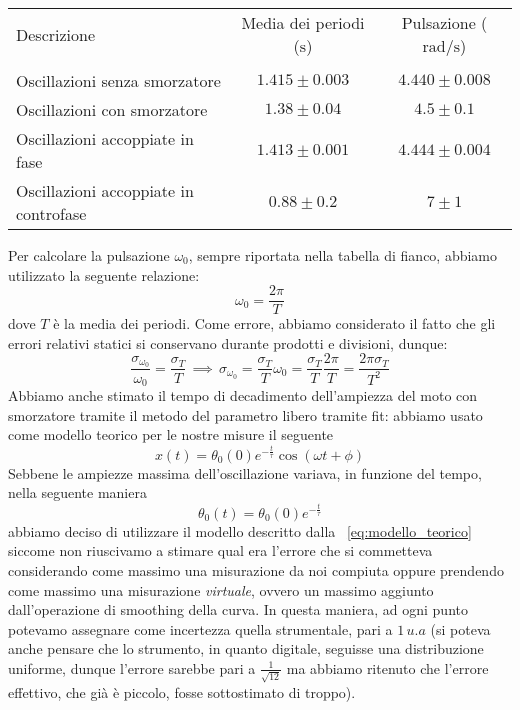 \documentclass{article}
\begin{document}
\begin{table}
\centering
\begin{tabular}{l c c} \toprule
Descrizione & Media dei periodi ($\si{\second}$) & Pulsazione ($\si{\radian\per\second}$) \\ \\ \toprule
Oscillazioni senza smorzatore & $1.415 \pm 0.003$ & $4.440 \pm 0.008$ \\ \midrule
Oscillazioni con smorzatore & $1.38 \pm 0.04$ & $4.5 \pm 0.1$ \\ \midrule
Oscillazioni accoppiate in fase & $1.413 \pm 0.001$ & $4.444 \pm 0.004$ \\ \midrule
Oscillazioni accoppiate in controfase & $0.88 \pm 0.2$ & $7 \pm 1$ \\ \bottomrule
\end{tabular}
\end{table}

\noindent Per calcolare la pulsazione $\omega_0$, sempre riportata nella tabella di fianco, abbiamo utilizzato la seguente relazione:
\begin{equation}
	\omega_0 = \frac{2\pi}{T}
\end{equation}
dove $T$ è la media dei periodi. Come errore, abbiamo considerato il fatto che gli errori relativi statici si conservano durante prodotti e divisioni, dunque:
\begin{equation*}
	\frac{\sigma_{\omega_0}}{\omega_0} = \frac{\sigma_{T}}{T} \, \implies \, \sigma_{\omega_0} = \frac{\sigma_T}{T} \omega_0 = \frac{\sigma_T}{T} \frac{2\pi}{T} = \frac{2\pi \sigma_T}{T^2}
\end{equation*}
Abbiamo anche stimato il tempo di decadimento dell'ampiezza del moto con smorzatore tramite il metodo del parametro libero tramite fit: abbiamo usato come modello teorico per le nostre misure il seguente
\begin{equation}
	x(t) = \theta_0 (0)e^{-\frac{t}{\tau}}\cos{\left( \omega t + \phi \right) }
	\label{eq:modello_teorico}
\end{equation}
Sebbene le ampiezze massima dell'oscillazione variava, in funzione del tempo, nella seguente maniera
$$
	\theta_0 (t) = \theta_0 (0) e^{-\frac{t}{\tau}}
$$
abbiamo deciso di utilizzare il modello descritto dalla ~\ref{eq:modello_teorico} siccome non riuscivamo a stimare qual era l'errore che si commetteva considerando come massimo una misurazione da noi compiuta oppure prendendo come massimo una misurazione \emph{virtuale}, ovvero un massimo aggiunto dall'operazione di smoothing della curva. In questa maniera, ad ogni punto potevamo assegnare come incertezza quella strumentale, pari a $1 \, u.a$ (si poteva anche pensare che lo strumento, in quanto digitale, seguisse una distribuzione uniforme, dunque l'errore sarebbe pari a $\frac{1}{\sqrt{12}}$ ma abbiamo ritenuto che l'errore effettivo, che già è piccolo, fosse sottostimato di troppo).
\end{document}
